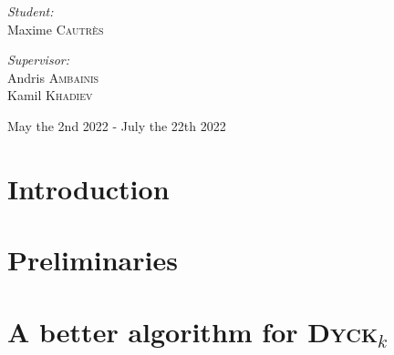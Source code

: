 \documentclass[11pt,a4paper]{article}
\newcommand{\Dyck}[1]{\textsc{Dyck$_{#1}$}}
\theoremstyle{definition}
\theoremstyle{plain}
\theoremstyle{definition}
\begin{document}
\begin{titlepage}
\begin{sffamily}
\begin{center}
            \hspace{-0.8cm}
            \begin{minipage}{0.4\textwidth}
                \begin{flushleft} \large
                    \emph{Student:} \\
                    Maxime \textsc{Cautrès}\\
                \end{flushleft}
            \end{minipage}
            \hspace{3cm}
            \begin{minipage}{0.4\textwidth}
                \begin{flushright} \large
                    \emph{Supervisor:}\\
                    Andris \textsc{Ambainis}\\
                    Kamil \textsc{Khadiev}\\
                \end{flushright}
            \end{minipage}

            \vspace*{0.5cm}
            {\large   May the 2nd 2022 -  July the 22th 2022}
        \end{center}
    \end{sffamily}
\end{titlepage}

\tableofcontents

\newpage

\section{Introduction}



\section{Preliminaries}\label{sec:preli}



\section{A better algorithm for \Dyck{k}}
\label{main_section}


\end{document}
